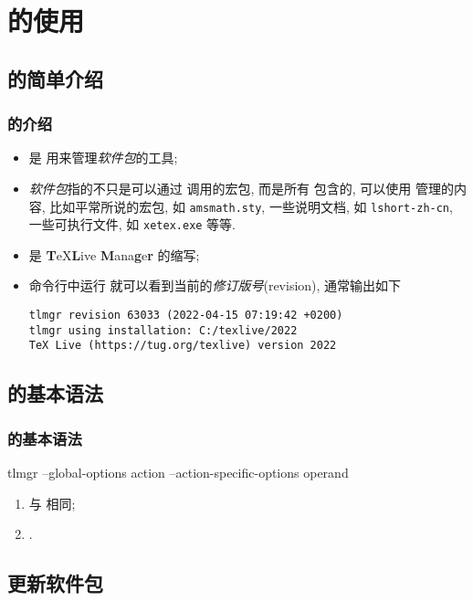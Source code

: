 \section{\tlmgr 的使用}
\subsection{\tlmgr 的简单介绍}
\begin{frame}[fragile]
  \frametitle{\tlmgr 的介绍}
  \begin{itemize}
    \item \tlmgr 是 \texlive 用来管理\emph{软件包}的工具;
    \item \emph{软件包}指的不只是可以通过 \lcmd{\usepackage} 调用的宏包, 而是所有 \texlive 包含的, 可以使用 \tlmgr 管理的内容, 比如平常所说的宏包, 如 \lstinline{amsmath.sty}, 一些说明文档, 如 \lstinline{lshort-zh-cn}, 一些可执行文件, 如 \lstinline{xetex.exe} 等等.
    \item \tlmgr 是 \textbf{T}eX\textbf{L}ive \textbf{M}ana\textbf{g}e\textbf{r} 的缩写;
    \item 命令行中运行  就可以看到当前的\emph{修订版号}(revision), 通常输出如下
\begin{lstlisting}
tlmgr revision 63033 (2022-04-15 07:19:42 +0200)
tlmgr using installation: C:/texlive/2022
TeX Live (https://tug.org/texlive) version 2022
\end{lstlisting}
  \end{itemize}
\end{frame}

\subsection{\tlmgr 的基本语法}

\begin{frame}[fragile]
  \frametitle{\tlmgr 的基本语法}
\begin{cmdcode}
tlmgr --global-options action --action-specific-options operand
\end{cmdcode}
\begin{enumerate}
  \item \cmd{-} 与 \cmd{--} 相同;
  \item {}.
\end{enumerate}
\end{frame}

\subsection{更新软件包}

